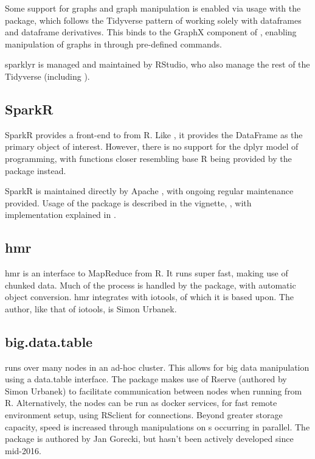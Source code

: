 Some support for graphs and graph manipulation is enabled via usage with
the  package, which follows the Tidyverse pattern of
working solely with dataframes and dataframe derivatives\cite{kuo18}.
This binds to the GraphX component of , enabling manipulation of
graphs in  through pre-defined commands.

sparklyr is managed and maintained by RStudio, who also manage the rest
of the Tidyverse (including ).

\hypertarget{sec:sparklyr}{%
    \subsection{SparkR}\label{sec:sparklyr}}

SparkR provides a front-end to  from
R\cite{venkataraman20:_spark}. Like , it provides the DataFrame
as the primary object of interest. However, there is no support for the
dplyr model of programming, with functions closer resembling base R
being provided by the package instead.

SparkR is maintained directly by Apache , with ongoing regular
maintenance provided. Usage of the package is described in the vignette,
\cite{venktaraman19:_spark_pract_guide}, with implementation
explained in \cite{venkataraman2016sparkr}.

\hypertarget{sec:hmr}{%
    \subsection{hmr}\label{sec:hmr}}

hmr is an interface to MapReduce from R\cite{urbanek20}. It runs super
fast, making use of chunked data. Much of the process is handled by the
package, with automatic \R object conversion. hmr integrates with
iotools, of which it is based upon. The author, like that of iotools, is
Simon Urbanek.

\hypertarget{sec:big.data.table}{%
    \subsection{big.data.table}\label{sec:big.data.table}}

 runs  over many nodes in an ad-hoc
cluster\cite{gorecki16}. This allows for big data manipulation using a
data.table interface. The package makes use of Rserve (authored by Simon
Urbanek) to facilitate communication between nodes when running from R.
Alternatively, the nodes can be run as docker services, for fast remote
environment setup, using RSclient for connections. Beyond greater
storage capacity, speed is increased through manipulations on
s occurring in parallel. The package is authored by Jan
Gorecki, but hasn't been actively developed since mid-2016.
